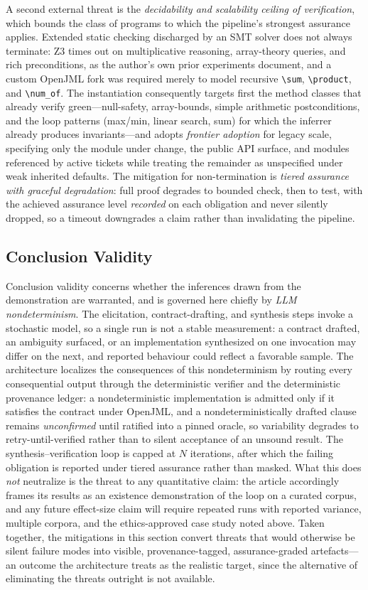 A second external threat is the \emph{decidability and scalability ceiling of verification}, which bounds the class of programs to which the pipeline's strongest assurance applies. Extended static checking discharged by an SMT solver does not always terminate: Z3 times out on multiplicative reasoning, array-theory queries, and rich preconditions, as the author's own prior experiments document, and a custom OpenJML fork was required merely to model recursive \verb|\sum|, \verb|\product|, and \verb|\num_of|. The instantiation consequently targets first the method classes that already verify green---null-safety, array-bounds, simple arithmetic postconditions, and the loop patterns (max/min, linear search, sum) for which the inferrer already produces invariants---and adopts \emph{frontier adoption} for legacy scale, specifying only the module under change, the public API surface, and modules referenced by active tickets while treating the remainder as unspecified under weak inherited defaults. The mitigation for non-termination is \emph{tiered assurance with graceful degradation}: full proof degrades to bounded check, then to test, with the achieved assurance level \emph{recorded} on each obligation and never silently dropped, so a timeout downgrades a claim rather than invalidating the pipeline.

\subsection{Conclusion Validity}
\label{subsec:threats-conclusion}

Conclusion validity concerns whether the inferences drawn from the demonstration are warranted, and is governed here chiefly by \emph{LLM nondeterminism}. The elicitation, contract-drafting, and synthesis steps invoke a stochastic model, so a single run is not a stable measurement: a contract drafted, an ambiguity surfaced, or an implementation synthesized on one invocation may differ on the next, and reported behaviour could reflect a favorable sample. The architecture localizes the consequences of this nondeterminism by routing every consequential output through the deterministic verifier and the deterministic provenance ledger: a nondeterministic implementation is admitted only if it satisfies the contract under OpenJML, and a nondeterministically drafted clause remains \emph{unconfirmed} until ratified into a pinned oracle, so variability degrades to retry-until-verified rather than to silent acceptance of an unsound result. The synthesis--verification loop is capped at $N$ iterations, after which the failing obligation is reported under tiered assurance rather than masked. What this does \emph{not} neutralize is the threat to any quantitative claim: the article accordingly frames its results as an existence demonstration of the loop on a curated corpus, and any future effect-size claim will require repeated runs with reported variance, multiple corpora, and the ethics-approved case study noted above. Taken together, the mitigations in this section convert threats that would otherwise be silent failure modes into visible, provenance-tagged, assurance-graded artefacts---an outcome the architecture treats as the realistic target, since the alternative of eliminating the threats outright is not available.
